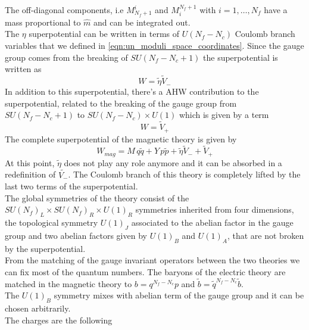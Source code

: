 The off-diagonal components, i.e $M^i_{N_f+1}$ and $M^{N_f+1}_i$ with $i=1,\dotsc,N_f$ have a mass proportional to $\hat{m}$ and can be integrated out.\\
The $\eta$ superpotential can be written in terms of $U(N_f - N_c)$ Coulomb branch variables that we defined in \eqref{eqn:un_moduli_space_coordinates}.
Since the gauge group comes from the breaking of $SU(N_f - N_c +1) $ the superpotential is written as
\begin{equation}
 W = \tilde{\eta} \tilde{V}_-
 \end{equation} 
In addition to this superpotential, there's a AHW contribution to the superpotential, related to the breaking of the gauge group from $SU(N_f - N_c +1)$ to $SU(N_f - N_c) \times U(1)$ which is given by a term 
\begin{equation}
W = \tilde{V}_+
\end{equation}
The complete superpotential of the magnetic theory is given by
\begin{equation}
W_{mag} = M \, q \tilde{q} + Y \, p \tilde{p} + \tilde{\eta} \tilde{V}_- + \tilde{V}_+
\label{eqn:sun_reduced_duality_superpotential}
\end{equation}
At this point, $\tilde{\eta}$ does not play any role anymore and it can be absorbed in a redefinition of $\tilde{V_-}$.
The Coulomb branch of this theory is completely lifted by the last two terms of the superpotential.\\
The global symmetries of the theory consist of the $SU(N_f)_L \times SU(N_f)_R \times U(1)_R$ symmetries inherited from four dimensions, the topological symmetry $U(1)_J$ associated to the abelian factor in the gauge group and two abelian factors given by $U(1)_B$ and $U(1)_A$, that are not broken by the superpotential.\\
From the matching of the gauge invariant operators between the two theories we can fix most of the quantum numbers.
The baryons of the electric theory are matched in the magnetic theory to $b = q^{N_f-N_c} p$ and $\tilde{b} = \tilde{q}^{N_f - N_c} \tilde{b}$.\\
The $U(1)_B$ symmetry mixes with abelian term of the gauge group and it can be chosen arbitrarily.\\
The charges are the following
